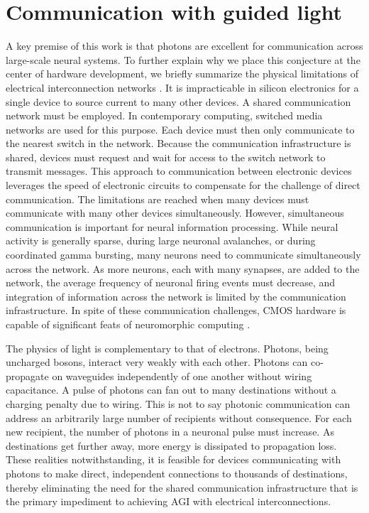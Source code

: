 \documentclass[twocolumn]{article}
\begin{document}
\section{\label{sec:communication}Communication with guided light}
A key premise of this work is that photons are excellent for communication across large-scale neural systems. To further explain why we place this conjecture at the center of hardware development, we briefly summarize the physical limitations of electrical interconnection networks \cite{hepa2012}. It is impracticable in silicon electronics for a single device to source current to many other devices. A shared communication network must be employed. In contemporary computing, switched media networks are used for this purpose. Each device must then only communicate to the nearest switch in the network. Because the communication infrastructure is shared, devices must request and wait for access to the switch network to transmit messages. This approach to communication between electronic devices leverages the speed of electronic circuits to compensate for the challenge of direct communication. The limitations are reached when many devices must communicate with many other devices simultaneously. However, simultaneous communication is important for neural information processing. While neural activity is generally sparse, during large neuronal avalanches, or during coordinated gamma bursting, many neurons need to communicate simultaneously across the network. As more neurons, each with many synapses, are added to the network, the average frequency of neuronal firing events must decrease, and integration of information across the network is limited by the communication infrastructure. In spite of these communication challenges, CMOS hardware is capable of significant feats of neuromorphic computing \cite{bo2000,pfgr2013,mear2014,fuga2014,payu2017,dasr2018}. 

The physics of light is complementary to that of electrons. Photons, being uncharged bosons, interact very weakly with each other. Photons can co-propagate on waveguides independently of one another without wiring capacitance. A pulse of photons can fan out to many destinations without a charging penalty due to wiring. This is not to say photonic communication can address an arbitrarily large number of recipients without consequence. For each new recipient, the number of photons in a neuronal pulse must increase. As destinations get further away, more energy is dissipated to propagation loss. These realities notwithstanding, it is feasible for devices communicating with photons to make direct, independent connections to thousands of destinations, thereby eliminating the need for the shared communication infrastructure that is the primary impediment to achieving AGI with electrical interconnections.
\end{document}
